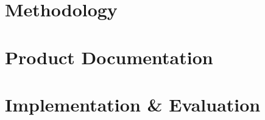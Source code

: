\documentclass[a4paper]{report}
\begin{document}


\chapter{Methodology}

 







\chapter{Product Documentation}


\chapter{Implementation \& Evaluation}


\end{document}
